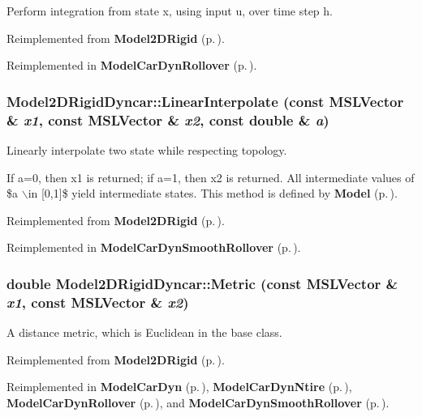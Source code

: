 Perform integration from state x, using input u, over time step h.



Reimplemented from {\bf Model2DRigid} {\rm (p.\,\pageref{classModel2DRigid_a2})}.

Reimplemented in {\bf Model\-Car\-Dyn\-Rollover} {\rm (p.\,\pageref{classModelCarDynRollover_a5})}.
\subsubsection{ Model2DRigid\-Dyncar::Linear\-Interpolate (const {\bf MSLVector} \& {\em x1}, const {\bf MSLVector} \& {\em x2}, const double \& {\em a})\hspace{0.3cm}{\tt  [virtual]}}\label{classModel2DRigidDyncar_a6}


Linearly interpolate two state while respecting topology.

If a=0, then x1 is returned; if a=1, then x2 is returned. All intermediate values of \$a $\backslash$in [0,1]\$ yield intermediate states. This method is defined by {\bf Model} {\rm (p.\,\pageref{classModel})}. 

Reimplemented from {\bf Model2DRigid} {\rm (p.\,\pageref{classModel2DRigid_a4})}.

Reimplemented in {\bf Model\-Car\-Dyn\-Smooth\-Rollover} {\rm (p.\,\pageref{classModelCarDynSmoothRollover_a5})}.
\subsubsection{\setlength{\rightskip}{0pt plus 5cm}double Model2DRigid\-Dyncar::Metric (const {\bf MSLVector} \& {\em x1}, const {\bf MSLVector} \& {\em x2})\hspace{0.3cm}{\tt  [virtual]}}\label{classModel2DRigidDyncar_a5}


A distance metric, which is Euclidean in the base class.



Reimplemented from {\bf Model2DRigid} {\rm (p.\,\pageref{classModel2DRigid_a5})}.

Reimplemented in {\bf Model\-Car\-Dyn} {\rm (p.\,\pageref{classModelCarDyn_a3})}, {\bf Model\-Car\-Dyn\-Ntire} {\rm (p.\,\pageref{classModelCarDynNtire_a3})}, {\bf Model\-Car\-Dyn\-Rollover} {\rm (p.\,\pageref{classModelCarDynRollover_a6})}, and {\bf Model\-Car\-Dyn\-Smooth\-Rollover} {\rm (p.\,\pageref{classModelCarDynSmoothRollover_a4})}.
